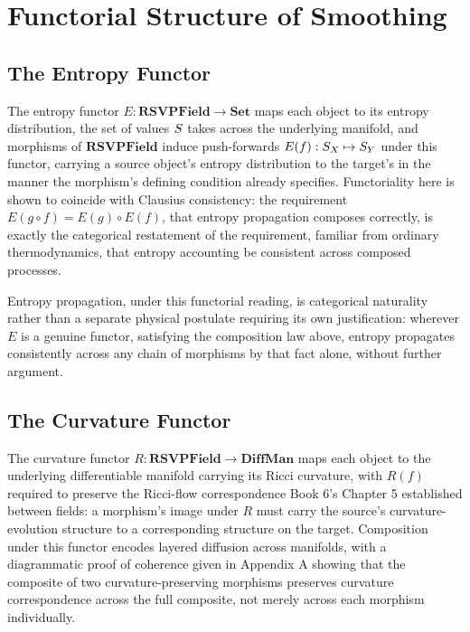 \part{Functorial Structure of Smoothing}

\chapter{The Entropy Functor}

The entropy functor $E: \mathbf{RSVPField} \to \mathbf{Set}$ maps each object to its entropy distribution, the set of values $S$ takes across the underlying manifold, and morphisms of $\mathbf{RSVPField}$ induce push-forwards $E(f): S_X \mapsto S_Y$ under this functor, carrying a source object's entropy distribution to the target's in the manner the morphism's defining condition already specifies. Functoriality here is shown to coincide with Clausius consistency: the requirement $E(g \circ f) = E(g) \circ E(f)$, that entropy propagation composes correctly, is exactly the categorical restatement of the requirement, familiar from ordinary thermodynamics, that entropy accounting be consistent across composed processes.

Entropy propagation, under this functorial reading, is categorical naturality rather than a separate physical postulate requiring its own justification: wherever $E$ is a genuine functor, satisfying the composition law above, entropy propagates consistently across any chain of morphisms by that fact alone, without further argument.

\chapter{The Curvature Functor}

The curvature functor $R: \mathbf{RSVPField} \to \mathbf{DiffMan}$ maps each object to the underlying differentiable manifold carrying its Ricci curvature, with $R(f)$ required to preserve the Ricci-flow correspondence Book 6's Chapter 5 established between fields: a morphism's image under $R$ must carry the source's curvature-evolution structure to a corresponding structure on the target. Composition under this functor encodes layered diffusion across manifolds, with a diagrammatic proof of coherence given in Appendix A showing that the composite of two curvature-preserving morphisms preserves curvature correspondence across the full composite, not merely across each morphism individually.

